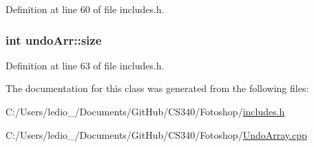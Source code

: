 Definition at line 60 of file includes.\-h.

\hypertarget{classundo_arr_a01b2d58c78f87f57f163702f565731a2}{
\subsubsection[{size}]{\setlength{\rightskip}{0pt plus 5cm}int undo\-Arr\-::size}}\label{classundo_arr_a01b2d58c78f87f57f163702f565731a2}


Definition at line 63 of file includes.\-h.



The documentation for this class was generated from the following files\-:\begin{DoxyCompactItemize}
\item 
C\-:/\-Users/ledio\-\_/\-Documents/\-Git\-Hub/\-C\-S340/\-Fotoshop/\hyperlink{includes_8h}{includes.\-h}\item 
C\-:/\-Users/ledio\-\_/\-Documents/\-Git\-Hub/\-C\-S340/\-Fotoshop/\hyperlink{_undo_array_8cpp}{Undo\-Array.\-cpp}\end{DoxyCompactItemize}
